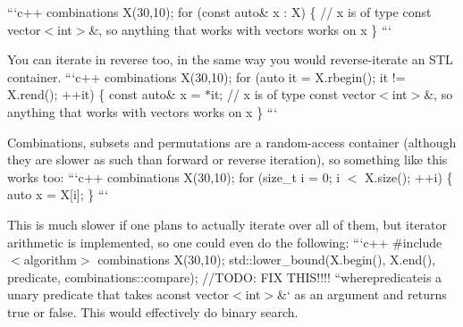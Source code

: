 ```c++ combinations X(30,10); for (const auto\& x \-: X) \{ // x is of type const vector$<$int$>$\&, so anything that works with vectors works on x \} ```

You can iterate in reverse too, in the same way you would reverse-\/iterate an S\-T\-L container. ```c++ combinations X(30,10); for (auto it = X.\-rbegin(); it != X.\-rend(); ++it) \{ const auto\& x = $\ast$it; // x is of type const vector$<$int$>$\&, so anything that works with vectors works on x \} ```

Combinations, subsets and permutations are a random-\/access container (although they are slower as such than forward or reverse iteration), so something like this works too\-: ```c++ combinations X(30,10); for (size\-\_\-t i = 0; i $<$ X.\-size(); ++i) \{ auto x = X\mbox{[}i\mbox{]}; \} ```

This is much slower if one plans to actually iterate over all of them, but iterator arithmetic is implemented, so one could even do the following\-: ```c++ \#include $<$algorithm$>$ combinations X(30,10); std\-::lower\-\_\-bound(X.\-begin(), X.\-end(), predicate, combinations\-::compare); //\-T\-O\-D\-O\-: F\-I\-X T\-H\-I\-S!!!! ``{\ttfamily  where}predicate{\ttfamily is a unary predicate that takes a}const vector$<$int$>$\&` as an argument and returns true or false. This would effectively do binary search. 